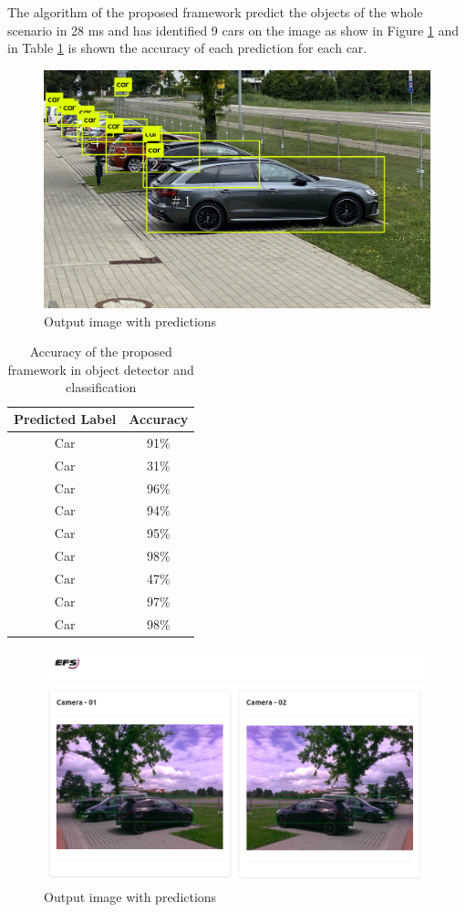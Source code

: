 The algorithm of the proposed framework predict the objects of the whole scenario in 28 ms and has identified 9 cars on the image as show in Figure \ref{fig:park_predict} and in Table \ref{tab:accuracy} is shown the accuracy of each prediction for each car. 
 



\begin{figure}[H]
\centering
\includegraphics[scale=0.3]{imagens/predictions.jpg}
\caption{Output image with predictions }
\label{fig:park_predict}
\end{figure}



\begin{table}[H]
\centering
\caption{Accuracy of the proposed framework in object detector and classification}
\begin{tabular}{c|c}
\hline
Predicted Label & Accuracy \\ \hline
Car             & 91\%     \\ \hline
Car             & 31\%     \\ \hline
Car             & 96\%     \\ \hline
Car             & 94\%     \\ \hline
Car             & 95\%     \\ \hline
Car             & 98\%     \\ \hline
Car             & 47\%     \\ \hline
Car             & 97\%     \\ \hline
Car             & 98\%     \\ \hline
\end{tabular}
\label{tab:accuracy}
\end{table}


\begin{figure}[H]
\centering
\includegraphics[scale=0.8]{imagens/output_framework.png}
\caption{Output image with predictions }
\label{fig:framework_predict}
\end{figure}